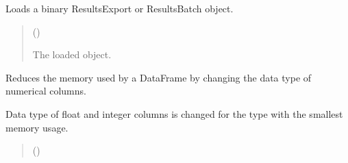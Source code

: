 \documentclass[letterpaper,10pt,english]{sphinxmanual}
\begin{document}
\begin{fulllineitems}

\begin{fulllineitems}
\label{\detokenize{generated/tamos.data_IO.ResultsExport:tamos.data_IO.ResultsExport.load_object}}
\pysigstartsignatures
{}
\pysigstopsignatures
\sphinxAtStartPar
Loads a binary ResultsExport or ResultsBatch object.
\begin{quote}\begin{description}
\sphinxAtStartPar
{} () \textendash{} 

\sphinxAtStartPar
The loaded object.

\end{description}\end{quote}

\end{fulllineitems}


\begin{fulllineitems}
\label{\detokenize{generated/tamos.data_IO.ResultsExport:tamos.data_IO.ResultsExport.reduce_memory}}
\pysigstartsignatures
{}
\pysigstopsignatures
\sphinxAtStartPar
Reduces the memory used by a DataFrame by changing the data type of numerical columns.

\sphinxAtStartPar
Data type of float and integer columns is changed for the type with the smallest memory usage.
\begin{quote}\begin{description}
\sphinxAtStartPar
{} () \textendash{} 

\end{description}\end{quote}

\end{fulllineitems}
\end{fulllineitems}
\end{document}
